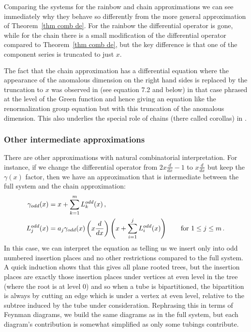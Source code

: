 \documentclass[oneside]{amsart}
\theoremstyle{definition}
\begin{document}
Comparing the systems for the rainbow and chain approximations we can see immediately why they behave so differently from the more general approximation of Theorem~\ref{thm comb de}.  For the rainbow the differential operator is gone, while for the chain there is a small modification of the differential operator compared to Theorem~\ref{thm comb de}, but the key difference is that one of the component series is truncated to just $x$.  

The fact that the chain approximation has a differential equation where the appearance of the anomalous dimension on the right hand sides is replaced by the truncation to $x$ was observed in \cite{Bdsems} (see equation 7.2 and below) in that case phrased at the level of the Green function and hence giving an equation like the renormalization group equation but with this truncation of the anomalous dimension. This also underlies the special role of chains (there called corollas) in \cite{DFY}.

\subsubsection{Other intermediate approximations}\label{sec other intermediate approx}

%

There are other approximations with natural combinatorial interpretation.  For instance, if we change the differential operator from $2x\frac{d}{dx}-1$ to $x\frac{d}{dx}$ but keep the $\gamma(x)$ factor, then we have an approximation that is intermediate between the full system and the chain approximation:
  \begin{align*} \gamma_{\rm odd}(x) & = x + \sum_{k=1}^m L_k^{\rm odd}(x)\,, \\
 L_j^{\rm odd}(x) & = a_j \gamma_{\rm odd}(x) \left(x\frac{d}{dx}\right)\left(x + \sum_{i=1}^{j}L_i^{\rm odd}(x)\right) \qquad \text{for $1\leq j\leq m$}\,. \end{align*}
In this case, we can interpret the equation as telling us we insert only into odd numbered insertion places and no other restrictions compared to the full system.  A quick induction shows that this gives all plane rooted trees, but the insertion places are exactly those insertion places under vertices at even level in the tree (where the root is at level 0) and so when a tube is bipartitioned, the bipartition is always by cutting an edge which is under a vertex at even level, relative to the subtree induced by the tube under consideration.  Rephrasing this in terms of Feynman diagrams, we build the same diagrams as in the full system, but each diagram's contribution is somewhat simplified as only some tubings contribute.
\end{document}
